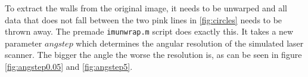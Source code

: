 \documentclass[a4paper, 20pt]{article}
\begin{document}
\begin{figure}[!ht]
\centering
\begin{floatrow}
  
\end{floatrow}
\end{figure}

To extract the walls from the original image, it needs to be unwarped and all
data that does not fall between the two pink lines in \ref{fig:circles} needs to
be thrown away. The premade \texttt{imunwrap.m} script does exactly this. It
takes a new parameter $angstep$ which determines the angular resolution of the
simulated laser scanner. The bigger the angle the worse the resolution is, as
can be seen in figure \ref{fig:angstep0.05} and \ref{fig:angstep5}.
\end{document}
